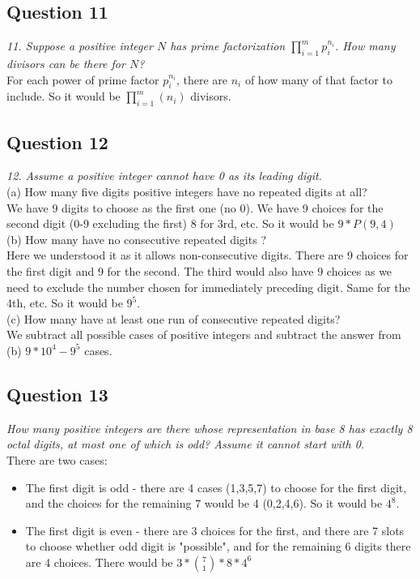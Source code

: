 \documentclass{article}
\begin{document}
\subsection{Question 11}
\emph{11. Suppose a positive integer $N$ has prime factorization $\prod_{i=1}^{m} p_{i}^{n_i}$.  How many divisors can be there for $N$?}
\\
\medskip
For each power of prime factor $p_{i}^{n_i}$, there are $n_i$ of how many of that factor to include. So it would be $\prod_{i=1}^m (n_i)$ divisors.
\\
\subsection{Question 12}
\emph{12. Assume a positive integer cannot have 0 as its leading digit.}
\\
\bigskip
(a) How many five digits positive integers have no repeated digits at all?
\\
\medskip
We have 9 digits to choose as the first one (no 0). We have 9 choices for the second digit (0-9 excluding the first) 8 for 3rd, etc. So it would be $9* P(9, 4)$
\\
\bigskip
(b) How many have no consecutive repeated digits ? 
\\
\medskip
Here we understood it as it allows non-consecutive digits. There are 9 choices for the first digit and 9 for the second. The third would also have 9 choices as we need to exclude the number chosen for immediately preceding digit. Same for the 4th, etc.
So it would be $9^5$.
\\
\bigskip
(c) How many have at least one run of consecutive repeated digits?
\\
\medskip
We subtract all possible cases of positive integers and subtract the answer from (b)
$9*10^{4} - 9^{5}$ cases.
\\
\bigskip
\subsection{Question 13}
\emph{How many positive integers are there whose representation in base 8 has exactly 8 octal digits, at most one of which is odd? Assume it cannot start with 0.}
\\
\medskip
There are two cases:
\begin{itemize}
    \item The first digit is odd - there are 4 cases (1,3,5,7) to choose for the first digit, and the choices for the remaining 7 would be 4 (0,2,4,6). So it would be $4^8$.
    \item The first digit is even - there are 3 choices for the first, and there are 7 slots to choose whether odd digit is "possible", and for the remaining 6 digits there are 4 choices. There would be $3*{7\choose1}*8*4^{6}$
\end{itemize}
\newpage
\end{document}
